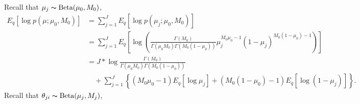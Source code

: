 \documentclass[11pt,reqno]{amsart}
\begin{document}
Recall that $\mu_j \thicksim \text{Beta}(\mu_0, M_0)$,
\begin{equation}
\begin{split}
E_q \left[ \log p\left(\mu ; \mu_0, M_0 \right)\right] &= \sum_{j=1}^{J} E_q  \left[ \log p\left( \mu_j; \mu_0, M_0 \right) \right] \\
&= \sum_{j=1}^{J} E_q  \left[ \log \left( \frac{ \Gamma(M_0) } { \Gamma(\mu_0 M_0) \Gamma(M_0 (1-\mu_0)) } \mu_j^{M_0\mu_0 -1} (1 - \mu_j)^{M_0 ( 1 - \mu_0) - 1} \right) \right] \\
&= J* \log \frac{ \Gamma(M_0) } { \Gamma(\mu_0 M_0) \Gamma(M_0 (1-\mu_0))} \\
&\quad + \sum_{j=1}^{J} \left\lbrace (M_0\mu_0 -1)E_q  \left[ \log \mu_j \right] + (M_0 ( 1 - \mu_0) - 1) E_q  \left[ \log (1 - \mu_j)\right]\right\rbrace.
\end{split}
\end{equation}
Recall that $\theta_{ji} \thicksim \text{Beta}(\mu_j, M_j)$,
\end{document}
